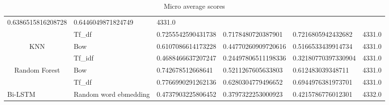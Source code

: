 \begin{table}[h!]
{\begin{tabular}{@{}clllll@{}}
  \multicolumn{1}{l|}{0.6386515816208728} &
  \multicolumn{1}{l|}{0.6446049871824749} &
  \multicolumn{1}{l|}{4331.0} \\ \cmidrule(l){2-6} 
\multicolumn{1}{|c|}{} &
  \multicolumn{1}{l|}{Tf\_df} &
  \multicolumn{1}{l|}{0.7255542590431738} &
  \multicolumn{1}{l|}{0.7178480720387901} &
  \multicolumn{1}{l|}{0.7216805942432682} &
  \multicolumn{1}{l|}{4331.0} \\ \midrule
\multicolumn{1}{|c|}{\multirow{2}{*}{KNN}} &
  \multicolumn{1}{l|}{Bow} &
  \multicolumn{1}{l|}{0.6107086614173228} &
  \multicolumn{1}{l|}{0.44770260909720616} &
  \multicolumn{1}{l|}{0.5166533439914734} &
  \multicolumn{1}{l|}{4331.0} \\ \cmidrule(l){2-6} 
\multicolumn{1}{|c|}{} &
  \multicolumn{1}{l|}{Tf\_idf} &
  \multicolumn{1}{l|}{0.4688466637207247} &
  \multicolumn{1}{l|}{0.24497806511198336} &
  \multicolumn{1}{l|}{0.32180770397330904} &
  \multicolumn{1}{l|}{4331.0} \\ \midrule
\multicolumn{1}{|c|}{\multirow{2}{*}{Random Forest}} &
  \multicolumn{1}{l|}{Bow} &
  \multicolumn{1}{l|}{0.742678512668641} &
  \multicolumn{1}{l|}{0.5211267605633803} &
  \multicolumn{1}{l|}{0.612483039348711} &
  \multicolumn{1}{l|}{4331.0} \\ \cmidrule(l){2-6} 
\multicolumn{1}{|c|}{} &
  \multicolumn{1}{l|}{Tf\_df} &
  \multicolumn{1}{l|}{0.7766990291262136} &
  \multicolumn{1}{l|}{0.6280304779496652} &
  \multicolumn{1}{l|}{0.6944976381973701} &
  \multicolumn{1}{l|}{4331.0} \\ \midrule
\multicolumn{1}{|l|}{Bi-LSTM} &
  \multicolumn{1}{l|}{Random word ebmedding} &
  \multicolumn{1}{l|}{0.4737903225806452} &
  \multicolumn{1}{l|}{0.3797322253000923} &
  \multicolumn{1}{l|}{0.4215786776012301} &
  \multicolumn{1}{l|}{4332.0} \\ \bottomrule
\end{tabular}%
}
\caption{Micro average scores}
\label{tab:Micro-average}
\end{table}


